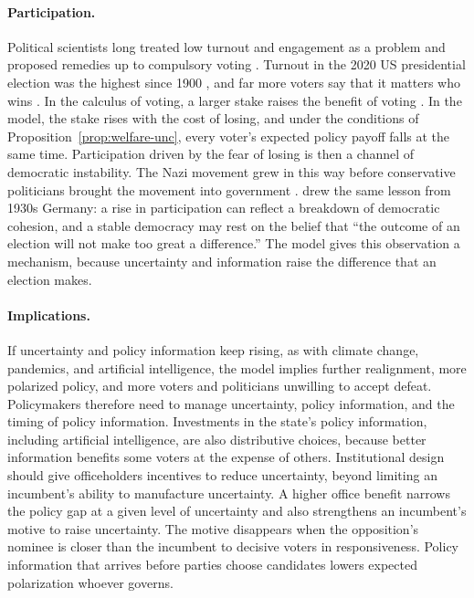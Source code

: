 \documentclass[12pt,letterpaper]{article}
\begin{document}
\paragraph{Participation.}
Political scientists long treated low turnout and engagement as a problem and proposed remedies up to compulsory voting \citep{Wattenberg2002,Patterson2002,Mair2013,Lijphart1997,Macedo2005,Fiorina1999,Kornhauser1959,LiftEveryVoice2020}. Turnout in the 2020 US presidential election was the highest since 1900 \citep{McDonald2020}, and far more voters say that it matters who wins \citep{Pew2020}. In the calculus of voting, a larger stake raises the benefit of voting \citep{RikerOrdeshook1968}. In the model, the stake rises with the cost of losing, and under the conditions of Proposition~\ref{prop:welfare-unc}, every voter's expected policy payoff falls at the same time. Participation driven by the fear of losing is then a channel of democratic instability. The Nazi movement grew in this way before conservative politicians brought the movement into government \citep{Hett2018}. \citet{Lipset1960} drew the same lesson from 1930s Germany: a rise in participation can reflect a breakdown of democratic cohesion, and a stable democracy may rest on the belief that ``the outcome of an election will not make too great a difference.'' The model gives this observation a mechanism, because uncertainty and information raise the difference that an election makes.

\paragraph{Implications.}
If uncertainty and policy information keep rising, as with climate change, pandemics, and artificial intelligence, the model implies further realignment, more polarized policy, and more voters and politicians unwilling to accept defeat. Policymakers therefore need to manage uncertainty, policy information, and the timing of policy information. Investments in the state's policy information, including artificial intelligence, are also distributive choices, because better information benefits some voters at the expense of others. Institutional design should give officeholders incentives to reduce uncertainty, beyond limiting an incumbent's ability to manufacture uncertainty. A higher office benefit narrows the policy gap at a given level of uncertainty and also strengthens an incumbent's motive to raise uncertainty. The motive disappears when the opposition's nominee is closer than the incumbent to decisive voters in responsiveness. Policy information that arrives before parties choose candidates lowers expected polarization whoever governs.
\end{document}

